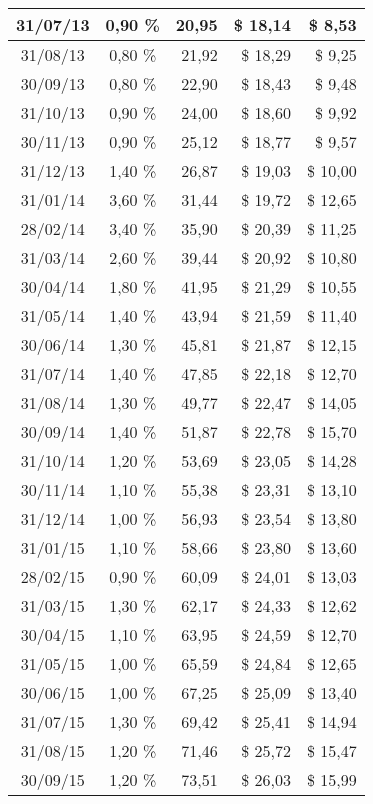 \begin{longtable}{|c|c|r|r|r|}
31/07/13 & 0,90 \% & 20,95 & \$ 18,14 & \$ 8,53 \\ \hline
31/08/13 & 0,80 \% & 21,92 & \$ 18,29 & \$ 9,25 \\ \hline
30/09/13 & 0,80 \% & 22,90 & \$ 18,43 & \$ 9,48 \\ \hline
31/10/13 & 0,90 \% & 24,00 & \$ 18,60 & \$ 9,92 \\ \hline
30/11/13 & 0,90 \% & 25,12 & \$ 18,77 & \$ 9,57 \\ \hline
31/12/13 & 1,40 \% & 26,87 & \$ 19,03 & \$ 10,00 \\ \hline
31/01/14 & 3,60 \% & 31,44 & \$ 19,72 & \$ 12,65 \\ \hline
28/02/14 & 3,40 \% & 35,90 & \$ 20,39 & \$ 11,25 \\ \hline
31/03/14 & 2,60 \% & 39,44 & \$ 20,92 & \$ 10,80 \\ \hline
30/04/14 & 1,80 \% & 41,95 & \$ 21,29 & \$ 10,55 \\ \hline
31/05/14 & 1,40 \% & 43,94 & \$ 21,59 & \$ 11,40 \\ \hline
30/06/14 & 1,30 \% & 45,81 & \$ 21,87 & \$ 12,15 \\ \hline
31/07/14 & 1,40 \% & 47,85 & \$ 22,18 & \$ 12,70 \\ \hline
31/08/14 & 1,30 \% & 49,77 & \$ 22,47 & \$ 14,05 \\ \hline
30/09/14 & 1,40 \% & 51,87 & \$ 22,78 & \$ 15,70 \\ \hline
31/10/14 & 1,20 \% & 53,69 & \$ 23,05 & \$ 14,28 \\ \hline
30/11/14 & 1,10 \% & 55,38 & \$ 23,31 & \$ 13,10 \\ \hline
31/12/14 & 1,00 \% & 56,93 & \$ 23,54 & \$ 13,80 \\ \hline
31/01/15 & 1,10 \% & 58,66 & \$ 23,80 & \$ 13,60 \\ \hline
28/02/15 & 0,90 \% & 60,09 & \$ 24,01 & \$ 13,03 \\ \hline
31/03/15 & 1,30 \% & 62,17 & \$ 24,33 & \$ 12,62 \\ \hline
30/04/15 & 1,10 \% & 63,95 & \$ 24,59 & \$ 12,70 \\ \hline
31/05/15 & 1,00 \% & 65,59 & \$ 24,84 & \$ 12,65 \\ \hline
30/06/15 & 1,00 \% & 67,25 & \$ 25,09 & \$ 13,40 \\ \hline
31/07/15 & 1,30 \% & 69,42 & \$ 25,41 & \$ 14,94 \\ \hline
31/08/15 & 1,20 \% & 71,46 & \$ 25,72 & \$ 15,47 \\ \hline
30/09/15 & 1,20 \% & 73,51 & \$ 26,03 & \$ 15,99 \\ \hline

\end{longtable}
